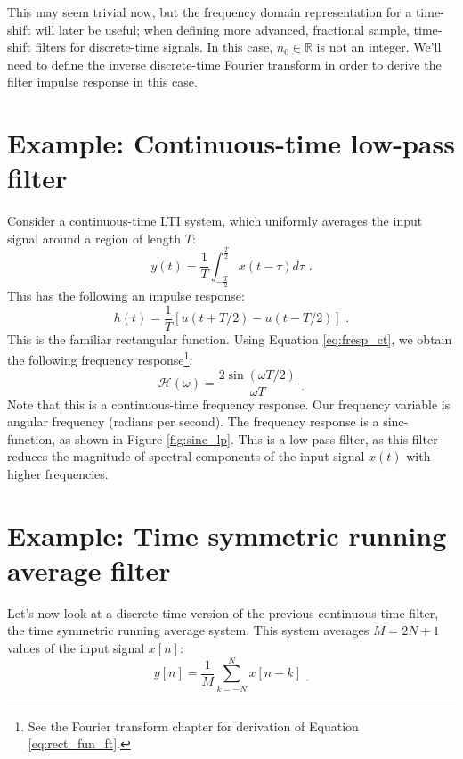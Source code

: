 This may seem trivial now, but the frequency domain representation for
a time-shift will later be useful; when defining more advanced,
fractional sample, time-shift filters for discrete-time signals. In
this case, $n_0 \in \mathbb{R}$ is not an integer. We'll need to
define the inverse discrete-time Fourier transform in order to derive
the filter impulse response in this case.


\section{Example: Continuous-time low-pass filter}

Consider a continuous-time LTI system, which uniformly averages the
input signal around a region of length $T$:
\begin{equation}
y(t) = \frac{1}{T}\int_{-\frac{T}{2}}^{\frac{T}{2}} x(t-\tau)d\tau \,\,.
\end{equation}
This has the following an impulse response:
\begin{equation}
h(t)=\frac{1}{T}[u(t+T/2)-u(t-T/2)] \,\,.
\label{eq:rect_fun}
\end{equation}
This is the familiar rectangular function. Using
Equation \ref{eq:fresp_ct}, we obtain the following frequency
response\footnote{See the Fourier transform chapter for derivation of Equation \ref{eq:rect_fun_ft}.}:
\begin{equation}
\mathcal{H}(\omega)=\frac{2\sin(\omega T/2)}{\omega T} \,\, _.
\label{eq:rect_fun_ft}
\end{equation}
Note that this is a continuous-time frequency response. Our frequency
variable is angular frequency (radians per second). The frequency
response is a sinc-function, as shown in
Figure \ref{fig:sinc_lp}. This is a low-pass filter, as this filter
reduces the magnitude of spectral components of the input signal
$x(t)$ with higher frequencies.


\section{Example: Time symmetric running average filter}

Let's now look at a discrete-time version of the previous
continuous-time filter, the time symmetric running average
system. This system averages $M=2N+1$ values of the input signal
$x[n]$:
\begin{equation}
y[n] = \frac{1}{M} \sum_{k=-N}^{N} x[n-k] \,\, _.
\end{equation}

